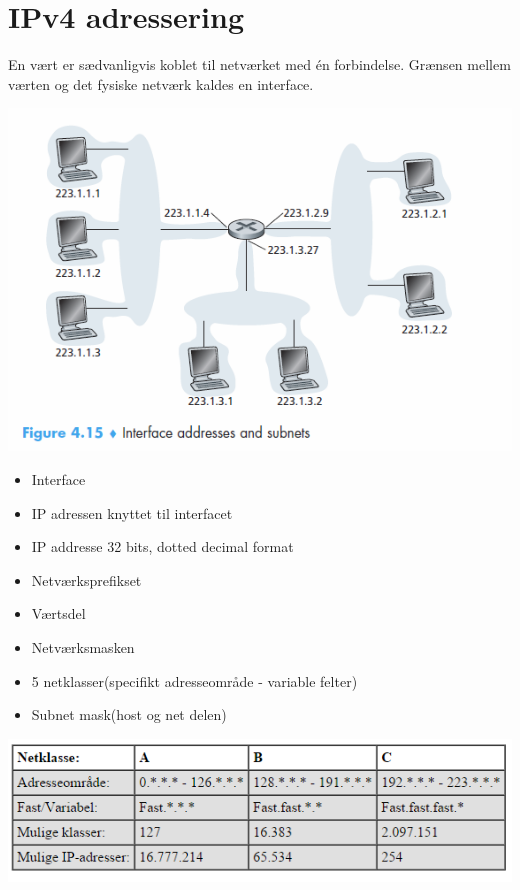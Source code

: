{{{{{\section{IPv4 adressering}
En vært er sædvanligvis koblet til netværket med én forbindelse. Grænsen mellem værten og det fysiske netværk kaldes en interface.
\begin{center}
  \includegraphics{4-network-layer/ipv4-adressering.png}
\end{center}
\begin{itemize}
	\item Interface
	\item IP adressen knyttet til interfacet
	\item IP addresse 32 bits, dotted decimal format
	\item Netværksprefikset
	\item Værtsdel
	\item Netværksmasken
	\item 5 netklasser(specifikt adresseområde - variable felter)
	\item Subnet mask(host og net delen)
\end{itemize}
{\includegraphics{4-network-layer/netklasser.png}
\begin{center}

\end{center}}}}}}}
